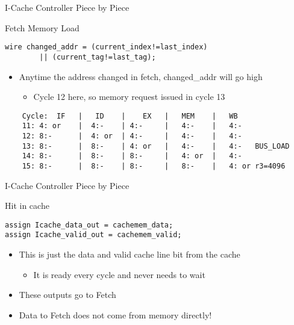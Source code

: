 \documentclass[table,dvipsnames]{beamer}
\begin{document}
\begin{frame}[fragile]{I-Cache Controller Piece by Piece}
	\begin{block}{Fetch Memory Load}
		\begin{verbatim}
wire changed_addr = (current_index!=last_index) 
		|| (current_tag!=last_tag);
		\end{verbatim}

	\begin{itemize}
		\item Anytime the address changed in fetch, changed\_addr will go high
		\begin{itemize}
			\item Cycle 12 here, so memory request issued in cycle 13
		\end{itemize}
	\end{itemize}

	\begin{verbatim}
	Cycle:  IF   |   ID    |    EX   |   MEM    |   WB
	11: 4: or    |  4:-    | 4:-     |   4:-    |	4:-
	12: 8:-      |  4: or  | 4:-     |   4:-    |	4:-
	13:	8:-      |  8:-    | 4: or   |   4:-    |	4:-   BUS_LOAD
	14: 8:-      |  8:-    | 8:-     |   4: or  |	4:-
	15:	8:-      |  8:-    | 8:-     |   8:-    |	4: or r3=4096
	\end{verbatim}
	\end{block}	
\end{frame}

\begin{frame}[fragile]{I-Cache Controller Piece by Piece}
	\begin{block}{Hit in cache}
		\begin{verbatim}
assign Icache_data_out = cachemem_data;
assign Icache_valid_out = cachemem_valid;
		\end{verbatim}

	\begin{itemize}
		\item This is just the data and valid cache line bit from the cache
		\begin{itemize}
			\item It is ready every cycle and never needs to wait
		\end{itemize}
		\item These outputs go to Fetch
		\item Data to Fetch does not come from memory directly!
	\end{itemize}
	\end{block}	
\end{frame}
\end{document}

